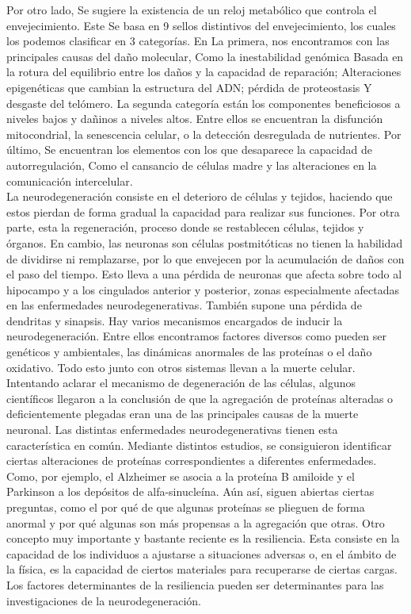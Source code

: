 Por otro lado, Se sugiere la existencia de un reloj metabólico que controla el envejecimiento. Este Se basa en 9 sellos distintivos del envejecimiento, los cuales los podemos clasificar en 3 categorías. En La primera, nos encontramos con las principales causas del daño molecular, Como la inestabilidad genómica Basada en la rotura del equilibrio entre los daños y la capacidad de reparación; Alteraciones epigenéticas que cambian la estructura del ADN; pérdida de proteostasis Y desgaste del telómero. La segunda categoría están los componentes beneficiosos a niveles bajos y dañinos a niveles altos. Entre ellos se encuentran la disfunción mitocondrial, la senescencia celular, o la detección desregulada de nutrientes. Por último, Se encuentran los elementos con los que desaparece la capacidad de autorregulación, Como el cansancio de células madre y las alteraciones en la comunicación intercelular.\\

La neurodegeneración consiste en el deterioro de células y tejidos, haciendo que estos pierdan de forma gradual la capacidad para realizar sus funciones. Por otra parte, esta la regeneración, proceso donde se restablecen células, tejidos y órganos. En cambio, las neuronas son células postmitóticas no tienen la habilidad de dividirse ni remplazarse, por lo que envejecen por la acumulación de daños con el paso del tiempo. Esto lleva a una pérdida de neuronas que afecta sobre todo al hipocampo y a los cingulados anterior y posterior, zonas especialmente afectadas en las enfermedades neurodegenerativas. También supone una pérdida de dendritas y sinapsis. 
Hay varios mecanismos encargados de inducir la neurodegeneración. Entre ellos encontramos factores diversos como pueden ser genéticos y ambientales, las dinámicas anormales de las proteínas o el daño oxidativo.   Todo esto junto con otros sistemas llevan a la muerte celular.\\

Intentando aclarar el mecanismo de degeneración de las células, algunos científicos llegaron a la conclusión de que la agregación de proteínas alteradas o deficientemente plegadas eran una de las principales causas de la muerte neuronal. Las distintas enfermedades neurodegenerativas tienen esta característica en común. Mediante distintos estudios, se consiguieron identificar ciertas alteraciones de proteínas correspondientes a diferentes enfermedades. Como, por ejemplo, el Alzheimer se asocia a la proteína B amiloide y el Parkinson a los depósitos de alfa-sinucleína.  Aún así, siguen abiertas ciertas preguntas, como el por qué de que algunas proteínas se plieguen de forma anormal y por qué algunas son más propensas a la agregación que otras.
Otro concepto muy importante y bastante reciente es la resiliencia. Esta consiste en la capacidad de los individuos a ajustarse a situaciones adversas o, en el ámbito de la física, es la capacidad de ciertos materiales para recuperarse de ciertas cargas. Los factores determinantes de la resiliencia pueden ser determinantes para las investigaciones de la neurodegeneración.

